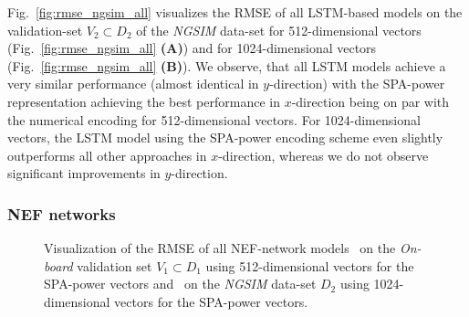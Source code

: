 Fig.~\ref{fig:rmse_ngsim_all} visualizes the \ac{RMSE} of all \ac{LSTM}-based models on the validation-set $V_2 \subset D_2$ of the \emph{\ac{NGSIM}} data-set for \num{512}-dimensional vectors (Fig.~\ref{fig:rmse_ngsim_all} \textbf{(A)}) and for \num{1024}-dimensional vectors (Fig.~\ref{fig:rmse_ngsim_all} \textbf{(B)}).
We observe, that all \ac{LSTM} models achieve a very similar performance (almost identical in $y$-direction) with the \ac{SPA}-power representation achieving the best performance in $x$-direction being on par with the numerical encoding for \num{512}-dimensional vectors.
For \num{1024}-dimensional vectors, the \ac{LSTM} model using the \ac{SPA}-power encoding scheme even slightly outperforms all other approaches in $x$-direction, whereas we do not observe significant improvements in $y$-direction.

\subsubsection{\ac{NEF} networks}
\label{subsubsec:eval_nef_models}
\begin{figure}[t!]
	\centering
    \vspace{-0.3cm}
    \caption{Visualization of the \ac{RMSE} of all \ac{NEF}-network models~\protect{} on the \emph{On-board} validation set $V_1 \subset D_1$ using \num{512}-dimensional vectors for the \ac{SPA}-power vectors and~\protect{} on the \emph{\ac{NGSIM}} data-set $D_2$ using \num{1024}-dimensional vectors for the \ac{SPA}-power vectors.}\label{fig:rmse_nef_nets}

\end{figure}

